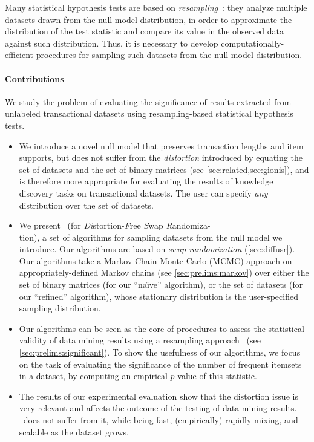 Many statistical hypothesis tests are based on
\emph{resampling}~\citep{WestfallY93}: they analyze multiple datasets drawn
from the null model distribution, in order to approximate the distribution of
the test statistic and compare its value in the observed data against such
distribution. Thus, it is necessary to develop computationally-efficient
procedures for sampling such datasets from the null model distribution.

\paragraph{Contributions} We study the problem of evaluating the significance of
results extracted from unlabeled transactional datasets using resampling-based
statistical hypothesis tests.

\begin{itemize}
  \item We introduce a novel null model that preserves transaction lengths and
    item supports, but does not suffer from  the \emph{distortion} introduced by
    equating the set of datasets and the set of binary matrices (see
    \cref{sec:related,sec:gionis}), and is therefore more appropriate for
    evaluating the results of knowledge discovery tasks on transactional
    datasets. The user can specify \emph{any} distribution over the set of
    datasets.
  \item We present \algo\ (for \emph{Di}stortion-\emph{F}ree
    \emph{S}wap \emph{R}andomiza-\\tion), a set of algorithms for sampling datasets
    from the null model we introduce. Our algorithms are based on
    \emph{swap-randomization} (\cref{sec:diffusr}). Our algorithms take a
    Markov-Chain Monte-Carlo (MCMC) approach on appropriately-defined Markov
    chains (see \cref{sec:prelims:markov}) over either the set of binary
    matrices (for our ``na\"{\i}ve'' algorithm), or the set of datasets (for our
    ``refined'' algorithm), whose stationary distribution is the user-specified
    sampling distribution.
  \item Our algorithms can be seen as the core of procedures to assess the
    statistical validity of data mining results using a resampling
    approach~\citep{WestfallY93} (see \cref{sec:prelims:significant}). To show
    the usefulness of our algorithms, we focus on the task of evaluating the
    significance of the number of frequent itemsets in a dataset, by
    computing an empirical $p$-value of this statistic.
  \item The results of our experimental evaluation show that the distortion
      issue is very relevant and affects the outcome of the testing of data mining
      results. \algo\ does not suffer from it, while being fast, (empirically)
      rapidly-mixing, and scalable as the dataset grows.
\end{itemize}

